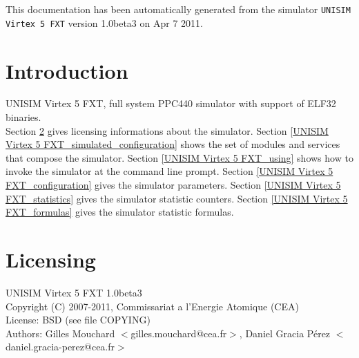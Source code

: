 This documentation has been automatically generated from the simulator \texttt{UNISIM Virtex 5 FXT} version 1.0beta3 on Apr  7 2011.
\section{Introduction}
UNISIM Virtex 5 FXT, full system PPC440 simulator with support of ELF32 binaries.\\
Section \ref{UNISIM Virtex 5 FXT_licensing} gives licensing informations about the simulator.
Section \ref{UNISIM Virtex 5 FXT_simulated_configuration} shows the set of modules and services that compose the simulator.
Section \ref{UNISIM Virtex 5 FXT_using} shows how to invoke the simulator at the command line prompt.
Section \ref{UNISIM Virtex 5 FXT_configuration} gives the simulator parameters.
Section \ref{UNISIM Virtex 5 FXT_statistics} gives the simulator statistic counters.
Section \ref{UNISIM Virtex 5 FXT_formulas} gives the simulator statistic formulas.
\section{Licensing}
\label{UNISIM Virtex 5 FXT_licensing}
UNISIM Virtex 5 FXT 1.0beta3\\
Copyright (C) 2007-2011, Commissariat a l'Energie Atomique (CEA)\\
License: BSD (see file COPYING)\\
Authors: Gilles Mouchard $<$gilles.mouchard@cea.fr$>$, Daniel Gracia P\'erez $<$daniel.gracia-perez@cea.fr$>$\\
